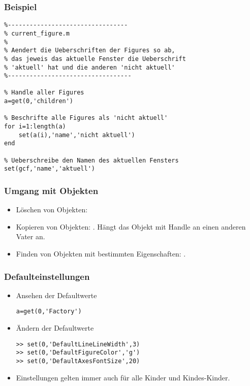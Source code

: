 %
%
\begin{frame}[fragile]\frametitle{Beispiel}
\begin{lstlisting}
%---------------------------------
% current_figure.m
%
% Aendert die Ueberschriften der Figures so ab,
% das jeweis das aktuelle Fenster die Ueberschrift 
% 'aktuell' hat und die anderen 'nicht aktuell' 
%----------------------------------

% Handle aller Figures
a=get(0,'children')

% Beschrifte alle Figures als 'nicht aktuell'
for i=1:length(a)
    set(a(i),'name','nicht aktuell')
end

% Ueberschreibe den Namen des aktuellen Fensters
set(gcf,'name','aktuell')
\end{lstlisting}
\end{frame}
%
%
\begin{frame}[fragile]\frametitle{Umgang mit Objekten}
\begin{itemize}
\item L\"oschen von Objekten: \alert{ }

\item Kopieren von Objekten: \alert{ }.
H\"angt das Objekt mit Handle  an einen anderen Vater
 an.

\item Finden von Objekten mit bestimmten Eigenschaften: \alert{
}.
\end{itemize}
\end{frame}
%
%
\begin{frame}[fragile]\frametitle{Defaulteinstellungen}
\begin{itemize}
\item Ansehen der Defaultwerte
\begin{lstlisting}
a=get(0,'Factory')
\end{lstlisting}
\item \"Andern der Defaultwerte
\begin{lstlisting}
>> set(0,'DefaultLineLineWidth',3)
>> set(0,'DefaultFigureColor','g')
>> set(0,'DefaultAxesFontSize',20)
\end{lstlisting}
\item Einstellungen gelten immer auch f\"ur alle Kinder und Kindes-Kinder.
\end{itemize}
\end{frame}
%
%
